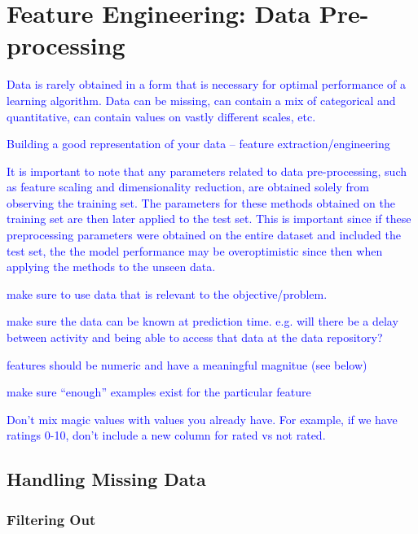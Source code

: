 \section{Feature Engineering: Data Pre-processing}

\textcolor{blue}{Data is rarely obtained in a form that is necessary for optimal performance of a learning algorithm. Data can be missing, can contain a mix of categorical and quantitative, can contain values on vastly different scales, etc.}

\textcolor{blue}{Building a good representation of your data -- feature extraction/engineering}

\textcolor{blue}{It is important to note that any parameters related to data pre-processing, such as feature scaling and dimensionality reduction, are obtained solely from observing the training set. The parameters for these methods obtained on the training set are then later applied to the test set. This is important since if these preprocessing parameters were obtained on the entire dataset and included the test set, the the model performance may be overoptimistic since then when applying the methods to the unseen data.}

\textcolor{blue}{make sure to use data that is relevant to the objective/problem.}


\textcolor{blue}{make sure the data can be known at prediction time. e.g. will there be a delay between activity and being able to access that data at the data repository?}


\textcolor{blue}{features should be numeric and have a meaningful magnitue (see below)}


\textcolor{blue}{make sure ``enough'' examples exist for the particular feature}

\textcolor{blue}{Don't mix magic values with values you already have. For example, if we have ratings 0-10, don't include a new column for rated vs not rated.}

\subsection{Handling Missing Data}

\subsubsection{Filtering Out}

